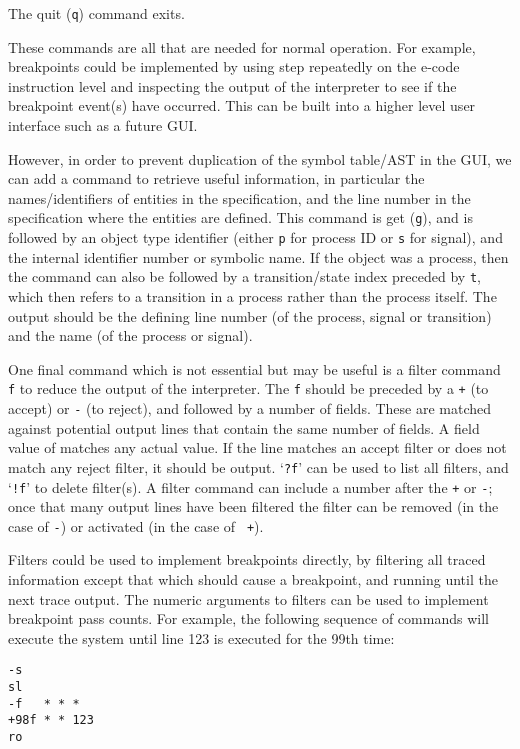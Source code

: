 The quit ({\tt q}) command exits.

These commands are all that are needed for normal operation. For example,
breakpoints could be implemented by using step repeatedly on the
e-code instruction level and inspecting the output of the interpreter
to see if the breakpoint event(s) have occurred. This can be built
into a higher level user interface such as a future GUI.

However, in order to prevent duplication of the symbol table/AST in
the GUI, we can add a command to retrieve useful information,
in particular the names/identifiers of entities in the specification,
and the line number in the specification where the entities are
defined. This command is get ({\tt g}), and is followed by an object
type identifier (either {\tt p} for process ID or {\tt s} for
signal), and the internal identifier number or symbolic name.
If the object was a process, then the command can also be followed
by a transition/state index preceded by {\tt t}, which then refers
to a transition in a process rather than the process itself.
The output should be the defining line number (of the process, signal
or transition) and the name (of the process or signal).

One final command which is not essential but may be useful is a
filter command {\tt f} to reduce the output of the interpreter.
The {\tt f} should be preceded by a {\tt +} (to accept) or {\tt -}
(to reject), and followed by a number of fields. These are matched
against potential output lines that contain the same
number of fields. A field value of {\tt *} matches any actual
value. If the line matches an accept filter or does not
match any reject filter, it should be output. `{\tt ?f}' can be
used to list all filters, and `{\tt !f}' to delete filter(s).
A filter command can include a number after the {\tt +} or {\tt -};
once that many output lines have been filtered the filter can be
removed (in the case of {\tt -}) or activated (in the case of {\tt
+}).

Filters could be used to implement breakpoints directly, by filtering
all traced information except that which should cause a breakpoint,
and running until the next trace output. The numeric arguments to
filters can be used to implement breakpoint pass counts.
For example, the following sequence of commands will execute the
system until line 123 is executed for the 99th time:

\begin{verbatim}
-s
sl
-f   * * *
+98f * * 123
ro
\end{verbatim}

